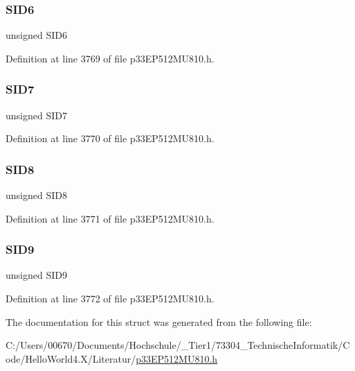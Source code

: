 \subsubsection{\texorpdfstring{S\+I\+D6}{SID6}}
{\footnotesize\ttfamily unsigned S\+I\+D6}



Definition at line 3769 of file p33\+E\+P512\+M\+U810.\+h.

\mbox{\label{structtag_c1_r_x_f1_s_i_d_b_i_t_s_a34097fb76decd431701fa2d86a22328e}} 
\subsubsection{\texorpdfstring{S\+I\+D7}{SID7}}
{\footnotesize\ttfamily unsigned S\+I\+D7}



Definition at line 3770 of file p33\+E\+P512\+M\+U810.\+h.

\mbox{\label{structtag_c1_r_x_f1_s_i_d_b_i_t_s_afe74894633244fdb0b0c01b4e8c522e7}} 
\subsubsection{\texorpdfstring{S\+I\+D8}{SID8}}
{\footnotesize\ttfamily unsigned S\+I\+D8}



Definition at line 3771 of file p33\+E\+P512\+M\+U810.\+h.

\mbox{\label{structtag_c1_r_x_f1_s_i_d_b_i_t_s_a33587704948067005c2a6a3ccc503c99}} 
\subsubsection{\texorpdfstring{S\+I\+D9}{SID9}}
{\footnotesize\ttfamily unsigned S\+I\+D9}



Definition at line 3772 of file p33\+E\+P512\+M\+U810.\+h.



The documentation for this struct was generated from the following file\+:\begin{DoxyCompactItemize}
\item 
C\+:/\+Users/00670/\+Documents/\+Hochschule/\+\_\+\+Tier1/73304\+\_\+\+Technische\+Informatik/\+Code/\+Hello\+World4.\+X/\+Literatur/\hyperlink{p33_e_p512_m_u810_8h}{p33\+E\+P512\+M\+U810.\+h}\end{DoxyCompactItemize}
